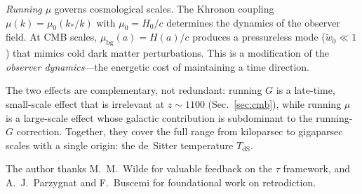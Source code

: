 \documentclass[prd,twocolumn,superscriptaddress,longbibliography,floatfix]{revtex4-2}
\newcommand{\tauasym}{\tau}
\begin{document}
\emph{Running $\mu$} governs cosmological scales.  The
Khronon coupling $\mu(k) = \mu_0(k_*/k)$ with
$\mu_0 = H_0/c$ determines the dynamics of the observer
field.  At CMB scales, $\mu_{\mathrm{bg}}(a) = H(a)/c$
produces a pressureless mode ($\tilde{w}_0 \ll 1$) that
mimics cold dark matter perturbations.  This is a
modification of the \emph{observer dynamics}---the energetic
cost of maintaining a time direction.

The two effects are complementary, not redundant: running
$G$ is a late-time, small-scale effect that is irrelevant at
$z \sim 1100$ (Sec.~\ref{sec:cmb}), while running $\mu$ is
a large-scale effect whose galactic contribution is
subdominant to the running-$G$ correction.  Together, they
cover the full range from kiloparsec to gigaparsec scales
with a single origin: the de~Sitter temperature
$T_{\mathrm{dS}}$.

\begin{acknowledgments}
The author thanks M.~M.~Wilde for valuable feedback on
the $\tauasym$ framework, and A.~J.~Parzygnat and
F.~Buscemi for foundational work on retrodiction.
\end{acknowledgments}

\end{document}
